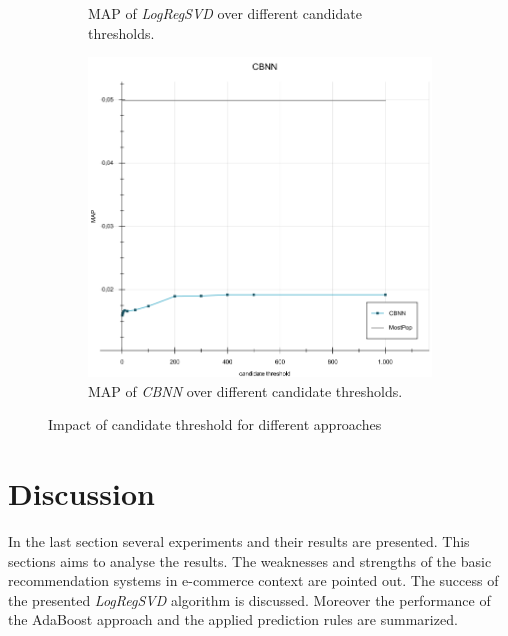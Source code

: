 \documentclass[10pt]{reportMaster}
\begin{document}
\begin{figure}
\begin{subfigure}[c]{0.5\textwidth}
		\caption{MAP of \textit{LogRegSVD} over different candidate thresholds.}
		\label{fig:LogRegSVDCandidates}
	\end{subfigure}
	\begin{subfigure}[c]{0.5\textwidth}
		\centering
		\includegraphics[width=1\textwidth]{figures/experiments/CBNNCandidates}
		\caption{MAP of \textit{CBNN} over different candidate thresholds.}
		\label{fig:CBNNCandidates}
	\end{subfigure}
	\caption{Impact of candidate threshold for different approaches}
	\label{fig:candidates}
\end{figure}


\section{Discussion}
\label{sec:discussion}
In the last section several experiments and their results are presented.
This sections aims to analyse the results.
The weaknesses and strengths of the basic recommendation systems in e-commerce context are pointed out.
The success of the presented \textit{LogRegSVD} algorithm is discussed.
Moreover the performance of the AdaBoost approach and the applied prediction rules are summarized.
\end{document}
